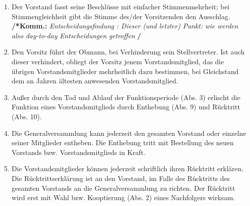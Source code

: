 \documentclass[a4paper,12pt]{article}
\newcommand{\comment}[1]{{\bf /*Komm.:} \textit{#1} {\bf */}}
\begin{document}
\begin{enumerate}
\item Der Vorstand fasst seine Beschlüsse mit einfacher Stimmenmehrheit; bei Stimmengleichheit gibt die Stimme des/der Vorsitzenden den Ausschlag.
\comment{Entscheidungsfindung : Dieser (und letzter) Punkt: wie werden also day-to-day Entscheidungen getroffen }

\item Den Vorsitz führt der Obmann, bei Verhinderung sein Stellvertreter. Ist auch dieser verhindert, obliegt der Vorsitz  jenem Vorstandsmitglied, das die übrigen Vorstandsmitglieder mehrheitlich dazu bestimmen, bei Gleichstand dem an Jahren ältesten anwesenden Vorstandsmitglied.

\item Außer durch den Tod und Ablauf der Funktionsperiode (Abs. 3) erlischt die Funktion eines Vorstandsmitglieds durch Enthebung (Abs. 9) und Rücktritt (Abs. 10).

\item Die Generalversammlung kann jederzeit den gesamten Vorstand oder einzelne seiner Mitglieder entheben. Die Enthebung tritt mit Bestellung des neuen Vorstands bzw. Vorstandsmitglieds in Kraft.

\item Die Vorstandsmitglieder können jederzeit schriftlich ihren Rücktritt erklären. Die Rücktrittserklärung ist an den Vorstand, im Falle des Rücktritts des gesamten Vorstands an die Generalversammlung zu richten. Der Rücktritt wird erst mit Wahl bzw. Kooptierung (Abs. 2) eines Nachfolgers wirksam.

\end{enumerate}
\end{document}
